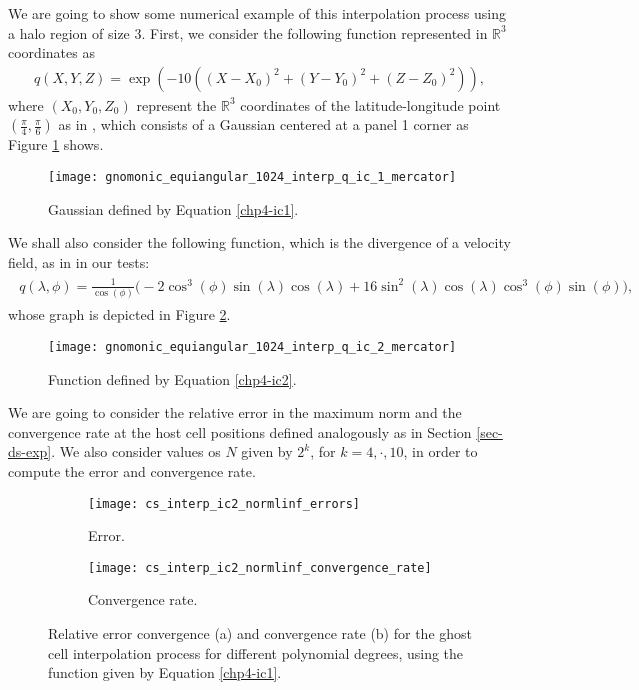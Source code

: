 We are going to show some numerical example of this interpolation process using a halo region of size 3.
First, we consider the following function represented in $\mathbb{R}^3$ coordinates as
\begin{align}
		\label{chp4-ic1}
		q(X,Y,Z) = \exp(-10((X-X_0)^2+(Y-Y_0)^2+(Z-Z_0)^2)),
\end{align}
where $(X_0,Y_0,Z_0)$ represent the $\mathbb{R}^3$ coordinates of the latitude-longitude point
$(\frac{\pi}{4},\frac{\pi}{6})$ as in \citet{zerroukat:2022}, which consists of a Gaussian centered 
at a panel 1 corner as Figure \ref{chp4-cs-ic1} shows.
\begin{figure}[!htb]
	\centering
	\texttt{[image: gnomonic\_equiangular\_1024\_interp\_q\_ic\_1\_mercator]}
	\caption{Gaussian defined by Equation \eqref{chp4-ic1}.}
	\label{chp4-cs-ic1}
\end{figure}

We shall also consider the following function, which is the divergence of a velocity field,
as in \citet{peixoto:13} in our tests:
\begin{align}
	\label{chp4-ic2}
	\begin{split}
	q(\lambda, \phi) = \frac{1}{\cos(\phi)}\bigg(-2\cos^3(\phi) \sin(\lambda) \cos(\lambda)
	+16\sin^2(\lambda)\cos(\lambda)\cos^3(\phi)\sin(\phi)\bigg),
	\end{split}
\end{align}
whose graph is depicted in Figure \ref{chp4-cs-ic2}.
\begin{figure}[!htb]
	\centering
	\texttt{[image: gnomonic\_equiangular\_1024\_interp\_q\_ic\_2\_mercator]}
	\caption{Function defined by Equation \eqref{chp4-ic2}.}
	\label{chp4-cs-ic2}
\end{figure}

We are going to consider the relative error in the maximum norm and the convergence rate 
at the host cell positions defined analogously as in Section \ref{sec-ds-exp}. 
We also consider values os $N$ given by $2^k$, for $k=4, \cdot, 10$, in order to compute the error and convergence rate.
\begin{figure}[!htb]
	\centering
	\begin{subfigure}{0.45\textwidth}
		\centering
		\texttt{[image: cs\_interp\_ic2\_normlinf\_errors]}
		\caption{Error.\label{chp4-exp1-error}}
	\end{subfigure}
	\begin{subfigure}{0.45\textwidth}
		\centering
		\texttt{[image: cs\_interp\_ic2\_normlinf\_convergence\_rate]}
		\caption{Convergence rate.\label{chp4-exp1-CR}}
	\end{subfigure}
	\caption{Relative error convergence (a) and convergence rate (b) for the ghost cell interpolation process for different
		polynomial degrees, using the function given by Equation \eqref{chp4-ic1}.\label{chp4-exp1}}
\end{figure}

